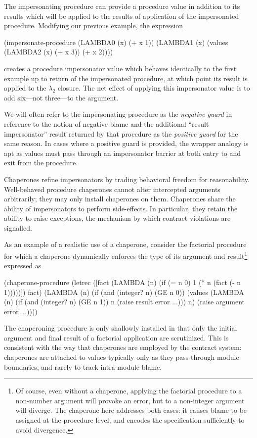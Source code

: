 \documentclass{sigplanconf}
\begin{document}
The impersonating procedure can provide a procedure value in addition to its results which will be applied to the results of application of the impersonated procedure.
Modifying our previous example, the expression
\begin{schemedisplay}
(impersonate-procedure (LAMBDA0 (x) (+ x 1))
                       (LAMBDA1 (x) (values (LAMBDA2 (x) (+ x 3)) (+ x 2))))
\end{schemedisplay}
creates a procedure impersonator value which behaves identically to the first example up to return of the impersonated procedure, at which point its result is applied to the $\lambda_2$ closure.
The net effect of applying this impersonator value is to add six---not three---to the argument.

We will often refer to the impersonating procedure as the \emph{negative guard} in reference to the notion of negative blame and the additional ``result impersonator'' result returned by that procedure as the \emph{positive guard} for the same reason. 
In cases where a positive guard is provided, the wrapper analogy is apt as values must pass through an impersonator barrier at both entry to and exit from the procedure.

Chaperones refine impersonators by trading behavioral freedom for reasonability.
Well-behaved procedure chaperones cannot alter intercepted arguments arbitrarily; they may only install chaperones on them.
Chaperones share the ability of impersonators to perform side-effects.
In particular, they retain the ability to raise exceptions, the mechanism by which contract violations are signalled.

As an example of a realistic use of a chaperone, consider the factorial procedure for which a chaperone dynamically enforces the type of its argument and result\footnote{Of course, even without a chaperone, applying the factorial procedure to a non-number argument will provoke an error, but to a non-integer argument will diverge. The chaperone here addresses both cases: it causes blame to be assigned at the procedure level, and encodes the specification sufficiently to avoid divergence.} expressed as
\begin{schemedisplay}
(chaperone-procedure
 (letrec ([fact (LAMBDA (n)
                  (if (= n 0)
                      1
                      (* n (fact (- n 1)))))])
   fact)
 (LAMBDA (n)
   (if (and (integer? n) (GE n 0))
       (values (LAMBDA (n)
                 (if (and (integer? n) (GE n 1))
                     n
                     (raise result error ...)))
               n)
       (raise argument error ...))))
\end{schemedisplay}
The chaperoning procedure is only shallowly installed in that only the initial argument and final result of a factorial application are scrutinized.
This is consistent with the way that chaperones are employed by the contract system: chaperones are attached to values typically only as they pass through module boundaries, and rarely to track intra-module blame.
\end{document}
